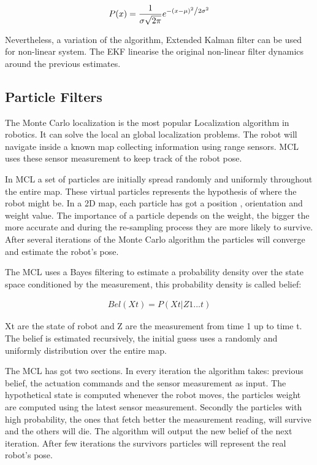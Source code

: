 \documentclass[10pt,journal,compsoc]{IEEEtran}
\begin{document}
\begin{align}
P(x) = \frac{1}{{\sigma \sqrt {2\pi } }}e^{{{ - \left( {x - \mu } \right)^2 } \mathord{\left/ {\vphantom {{ - \left( {x - \mu } \right)^2 } {2\sigma ^2 }}} \right. \kern-\nulldelimiterspace} {2\sigma ^2 }}}
\end{align}

Nevertheless, a variation of the algorithm, Extended Kalman filter can be used for non-linear system. The EKF linearise the original non-linear filter dynamics around the previous estimates.

\subsection{Particle Filters}

The Monte Carlo localization is the most popular Localization algorithm in robotics. It can solve the local an global localization problems. The robot will navigate inside a known map collecting information using range sensors. MCL uses these sensor measurement to keep track of the robot pose. 

In MCL a set of particles are initially spread randomly and uniformly throughout the entire map. These virtual particles represents the hypothesis of where the robot might be. In a 2D map, each particle has got a position , orientation and weight value. The importance of a particle depends on the weight, the bigger the more accurate and during the re-sampling process they are more likely to survive. After several iterations of the Monte Carlo algorithm the particles will converge and estimate the robot's pose.

The MCL uses a Bayes filtering to estimate a probability density over the state space conditioned by the measurement, this probability density is called belief:

\begin{align}
Bel(X{t}) = P(X{t} |Z{1}...{t} )
\end{align}

X{t} are the state of robot and Z are the measurement from time 1 up to time {t}. The belief is estimated recursively, the initial guess uses a randomly and uniformly distribution over the entire map.

The MCL has got two sections. In every iteration the algorithm takes: previous belief, the actuation commands and the sensor measurement as input. The hypothetical state is computed whenever the robot moves, the particles weight are computed using the latest sensor measurement. Secondly the particles with high probability, the ones that fetch better the measurement reading, will survive and the others will die. The algorithm will output the new belief of the next iteration. After few iterations the survivors particles will represent the real robot's pose.
\end{document}
